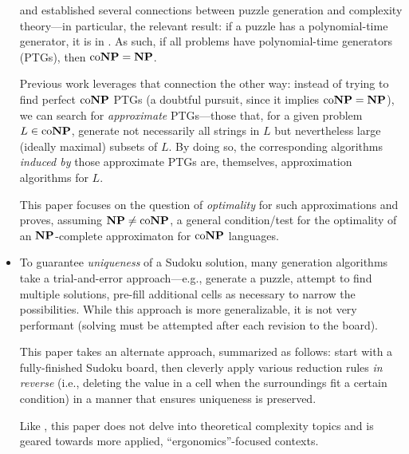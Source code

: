 \begin{itemize}
\begin{annotation}
      \textcite{language-instances} and \textcite{test-gen-complexity}
      established several connections between puzzle generation and complexity
      theory---in particular, the relevant result: if a puzzle has a
      polynomial-time generator, it is in \NP.  As such, if all \co\NP{}
      problems have polynomial-time generators (PTGs), then \(\operatorname{co}\!{\mathbf{NP}} = \mathbf{NP}\).

      Previous work leverages that connection the other way: instead of trying
      to find perfect \(\operatorname{co}\!{\mathbf{NP}}\) PTGs (a doubtful pursuit, since it implies
      \(\operatorname{co}\!{\mathbf{NP}} = \mathbf{NP}\)), we can search for \emph{approximate} PTGs---those
      that, for a given problem \(L \in \operatorname{co}\!{\mathbf{NP}}\), generate not necessarily all
      strings in \(L\) but nevertheless large (ideally maximal) subsets of
      \(L\).  By doing so, the corresponding \NP{} algorithms \emph{induced by}
      those approximate PTGs are, themselves, approximation algorithms for
      \(L\).

      This paper focuses on the question of \emph{optimality} for such
      approximations and proves, assuming \(\mathbf{NP} \ne \operatorname{co}\!{\mathbf{NP}}\), a general
      condition/test for the optimality of an \(\mathbf{NP}\)-complete approximaton for
      \(\operatorname{co}\!{\mathbf{NP}}\) languages.
    \end{annotation}

  \item {}

    \begin{annotation}
      To guarantee \emph{uniqueness} of a Sudoku solution, many generation
      algorithms take a trial-and-error approach---e.g., generate a puzzle,
      attempt to find multiple solutions, pre-fill additional cells as
      necessary to narrow the possibilities.  While this approach is more
      generalizable, it is not very performant (solving must be attempted after
      each revision to the board).

      This paper takes an alternate approach, summarized as follows: start with
      a fully-finished Sudoku board, then cleverly apply various reduction
      rules \emph{in reverse} (i.e., deleting the value in a cell when the
      surroundings fit a certain condition) in a manner that ensures uniqueness
      is preserved.

      Like \textcite{strategy-solvable-sudoku}, this paper does not delve into
      theoretical complexity topics and is geared towards more applied,
      ``ergonomics''-focused contexts.
    \end{annotation}


\end{itemize}
